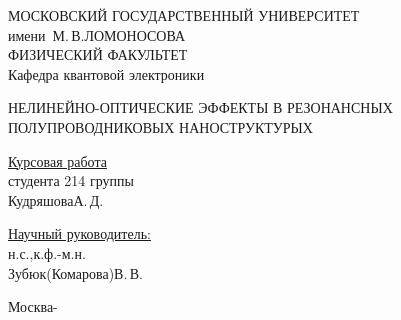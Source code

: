 \begin{titlepage}

\begin{center}
\large
МОСКОВСКИЙ ГОСУДАРСТВЕННЫЙ УНИВЕРСИТЕТ\\
имени~М.\,В.\;ЛОМОНОСОВА\\
ФИЗИЧЕСКИЙ ФАКУЛЬТЕТ\\
Кафедра квантовой электроники
\end{center}

\vfill

\begin{center}
\large
НЕЛИНЕЙНО-ОПТИЧЕСКИЕ ЭФФЕКТЫ В РЕЗОНАНСНЫХ ПОЛУПРОВОДНИКОВЫХ НАНОСТРУКТУРЫХ
\end{center}

\vfill

\begin{flushright}
\begin{minipage}{0.35\textwidth}
\underline{Курсовая работа}\\
студента 214 группы\\
Кудряшова\;А.\,Д.
\end{minipage}
\end{flushright}
\vspace*{6mm}
\begin{flushright}
\begin{minipage}{0.35\textwidth}
\underline{Научный руководитель:}\\
н.с.,\;к.ф.-м.н.\\
Зубюк(Комарова)\;В.\,В.\\
\end{minipage}
\end{flushright}

\vfill

\centerline{Москва\;-}

\end{titlepage}